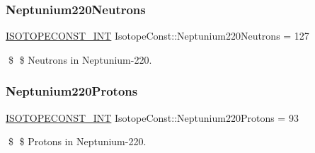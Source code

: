 \subsubsection{\texorpdfstring{Neptunium220\+Neutrons}{Neptunium220Neutrons}}
{\footnotesize\ttfamily \mbox{\hyperlink{group___isotope_const-_macros_ga5f18360b3e99483a35c32d789e62621c}{I\+S\+O\+T\+O\+P\+E\+C\+O\+N\+S\+T\+\_\+\+I\+NT}} Isotope\+Const\+::\+Neptunium220\+Neutrons = 127}

\$ \$ Neutrons in Neptunium-\/220. \mbox{\label{group___isotope_const-_neptunium-_np220_ga1b99e4c7c6ab3dc4201bfdb91946ac83}} 
\subsubsection{\texorpdfstring{Neptunium220\+Protons}{Neptunium220Protons}}
{\footnotesize\ttfamily \mbox{\hyperlink{group___isotope_const-_macros_ga5f18360b3e99483a35c32d789e62621c}{I\+S\+O\+T\+O\+P\+E\+C\+O\+N\+S\+T\+\_\+\+I\+NT}} Isotope\+Const\+::\+Neptunium220\+Protons = 93}

\$ \$ Protons in Neptunium-\/220. 